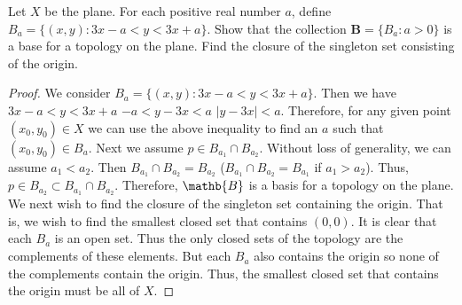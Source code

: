 
\begin{question}[Fasano]
Let $X$ be the plane. For each positive real number $a$, define $B_a=\{(x,y):3x-a<y<3x+a\}$. Show that the collection $\mathbf{B}=\{B_a:a>0\}$ is a base for a topology on the plane. Find the closure of the singleton set consisting of the origin.
\end{question}

\begin{proof}
    We consider $B_a=\{(x,y):3x-a<y<3x+a\}$. Then we have \newline \centering $3x-a<y<3x+a$ \newline \centering $-a<y-3x<a$ \newline \centering $|y-3x|<a$. \newline Therefore, for any given point $(x_0,y_0)\in X$ we can use the above inequality to find an $a$ such that $(x_0,y_0)\in B_a$. \newline Next we assume $p\in B_{a_1} \cap B_{a_2}$. Without loss of generality, we can assume $a_1<a_2$. Then $B_{a_1}\cap B_{a_2}=B_{a_2}$ ($B_{a_1}\cap B_{a_2}=B_{a_1}$ if $a_1>a_2$). Thus, $p\in B_{a_2}\subset B_{a_1}\cap B_{a_2}$. Therefore, $\mathb{B}$ is a basis for a topology on the plane. 
    \newline We next wish to find the closure of the singleton set containing the origin. That is, we wish to find the smallest closed set that contains ${(0,0)}$. It is clear that each $B_a$ is an open set. Thus the only closed sets of the topology are the complements of these elements. But each $B_a$ also contains the origin so none of the complements contain the origin. Thus, the smallest closed set that contains the origin must be all of $X$.
\end{proof}

